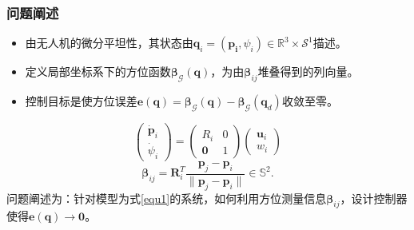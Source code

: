 \documentclass{beamer}
\theoremstyle{remark}
\begin{document}
\begin{frame}
	\frametitle{问题阐述}
	\begin{itemize}
		\item 由无人机的微分平坦性，其状态由$\bm{q}_i=(\bm{p_i}, {\psi}_i) \in \mathbb{R}^3\times\mathcal{S}^1$描述。
		\item 定义局部坐标系下的方位函数$\bm{\beta}_{\mathcal{G}}(\bm{q})$，为由$\bm{\beta}_{ij}$堆叠得到的列向量。
		\item 控制目标是使方位误差$\bm{e}(\bm{q}) =\bm{\beta}_{\mathcal{G}}(\bm{q})   −  \bm{\beta}_{\mathcal{G}}(\bm{q}_{d})  $收敛至零。
		
	\end{itemize}
	\quad
	\quad
	\begin{equation}
		\left.\left(\begin{array}{c}\dot{\bm{p}}_i\\\dot{\psi}_i\end{array}\right.\right)=\left(\begin{array}{cc}R_i&0\\\bm{0}&1\end{array}\right)\left(\begin{array}{c}\bm{u}_i\\w_i\end{array}\right)
		\label{equ1}
	\end{equation}
	\quad
	\quad
	\begin{equation}
		\bm{\beta}_{ij}=\bm{R}_{i}^{T}\frac{\bm{p}_{j}-\bm{p}_{i}}{\|\bm{p}_{j}-\bm{p}_{i}\|}\in\mathbb{S}^{2}.
	\end{equation}
	\quad
	\quad
	问题阐述为：针对模型为式\eqref{equ1}的系统，如何利用方位测量信息$\bm{\beta}_{ij}$，设计控制器使得$\bm{e}(\bm{q}) \to \bm{0}$。
\end{frame}
\end{document}
